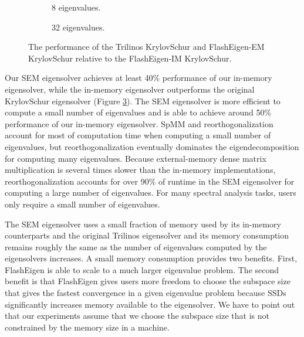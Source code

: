 \begin{figure}[t]
\centering
\footnotesize
\vspace{-15pt}
\begin{subfigure}{.5\linewidth}
	
	\vspace{-15pt}
	\caption{8 eigenvalues.}
	\label{fig:eigen8}
\end{subfigure}%
\begin{subfigure}{.5\linewidth}
	
	\vspace{-15pt}
	\caption{32 eigenvalues.}
	\label{fig:eigen32}
\end{subfigure}
\caption{The performance of the Trilinos KrylovSchur and FlashEigen-EM
KrylovSchur relative to the FlashEigen-IM KrylovSchur.}
\vspace{-15pt}
\label{fig:eigen}
\end{figure}

Our SEM eigensolver achieves at least 40\% performance of our in-memory
eigensolver, while the in-memory eigensolver outperforms the original
KrylovSchur eigensolver (Figure \ref{fig:eigen}). The SEM eigensolver
is more efficient to compute a small number of eigenvalues and is able
to achieve around 50\% performance of our in-memory eigensolver.
SpMM and reorthogonalization
account for most of computation time when computing a small number of eigenvalues,
but reorthogonalization eventually dominates the eigendecomposition for computing
many eigenvalues. Because external-memory dense matrix multiplication is several
times slower than the in-memory implementations, reorthogonalization accounts for
over 90\% of runtime in the SEM eigensolver for computing a large number of
eigenvalues. For many spectral analysis tasks, users only require a small number
of eigenvalues.

The SEM eigensolver uses a small fraction of memory used by its in-memory
counterparts and the original Trilinos eigensolver and its memory consumption
remains roughly the same as the number of eigenvalues computed by the eigensolvers
increases. A small memory consumption provides two benefits. First, FlashEigen
is able to scale to a much larger eigenvalue problem. The second benefit is that
FlashEigen gives users more freedom to choose the subspace size that gives the
fastest convergence in a given eigenvalue problem because SSDs significantly
increases memory available to the eigensolver. We have to point out that our
experiments assume that we choose the subspace size that is not constrained by
the memory size in a machine.

